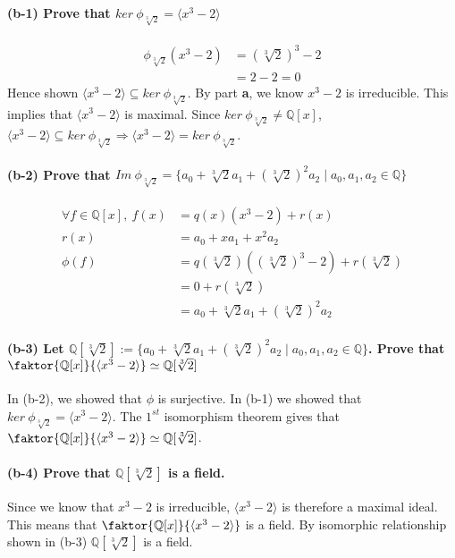 \documentclass[12pt]{article}
\begin{document}
\begin{enumerate}
\begin{enumerate}
				\paragraph{(b-1) Prove that $ker\ \phi_{\sqrt[3]{2}} = \langle x^3-2
									 \rangle$}
				\begin{align*}
					\phi_{\sqrt[3]{2}}(x^3-2) &= (\sqrt[3]{2})^3 - 2\\
					&= 2-2 = 0
				\end{align*}
				Hence shown $\langle x^3-2 \rangle \subseteq ker\ \phi_{\sqrt[3]{2}}$.
				By part \textbf{a}, we know $x^3 - 2$ is irreducible. This implies that
				$\langle x^3-2 \rangle$ is maximal. Since $ker\ \phi_{\sqrt[3]{2}} \neq
				\mathbb{Q}[x]$, $\langle x^3-2 \rangle \subseteq ker\ \phi_{\sqrt[3]{2}}
				\Rightarrow \langle x^3-2 \rangle = ker\ \phi_{\sqrt[3]{2}}$.

				\paragraph{(b-2) Prove that $Im\ \phi_{\sqrt[3]{2}} = \{a_0 +
					\sqrt[3]{2}a_1 + (\sqrt[3]{2})^2a_2 \mid a_0, a_1, a_2 \in
					\mathbb{Q}\}$}
					\begin{align*}
						\forall f \in \mathbb{Q}[x],\ f(x) &= q(x)(x^3-2) + r(x)\\
						r(x) &= a_0 + xa_1 + x^2a_2\\
						\phi(f) &= q(\sqrt[3]{2})((\sqrt[3]{2})^3-2) + r(\sqrt[3]{2})\\
							&= 0 + r(\sqrt[3]{2})\\
							&= a_0 + \sqrt[3]{2}a_1 + (\sqrt[3]{2})^2a_2
					\end{align*}

				\paragraph{(b-3) Let $\mathbb{Q}[\sqrt[3]{2}] := \{a_0 +
					\sqrt[3]{2}a_1 + (\sqrt[3]{2})^2a_2 \mid a_0, a_1, a_2 \in
					\mathbb{Q}\}$. Prove that $\faktor{\mathbb{Q}[x]}{\langle x^3-2
					\rangle}\simeq \mathbb{Q}[\sqrt[3]{2}]$\\}
					In (b-2), we showed that $\phi$ is surjective. In (b-1) we showed that
					$ker\ \phi_{\sqrt[3]{2}} = \langle x^3-2 \rangle$. The $1^{st}$
					isomorphism theorem gives that $\faktor{\mathbb{Q}[x]}{\langle x^3-2
					\rangle} \simeq \mathbb{Q}[\sqrt[3]{2}]$.

					\paragraph{(b-4) Prove that $\mathbb{Q}[\sqrt[3]{2}]$ is a field.\\}
					Since we know that $x^3-2$ is irreducible, $\langle x^3-2 \rangle$ is
					therefore a maximal ideal. This means that
					$\faktor{\mathbb{Q}[x]}{\langle x^3-2 \rangle}$ is a field. By
					isomorphic relationship shown in (b-3) $\mathbb{Q}[\sqrt[3]{2}]$ is a
					field.
		\end{enumerate}


\end{enumerate}
\end{document}
